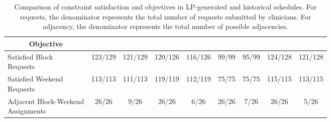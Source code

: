 \begin{table}[htbp]
\begin{adjustbox}{angle=90, scale=0.9}
\begin{tabular}{l|cc|cc|cc|cc}
			\multicolumn{1}{c|}{\textbf{Objective}}             &            &                       &            &                       &            &                       &            &                      \\ \midrule
			\makecell[l]{Satisfied Block \\ Requests}           &  123/129   &        121/129        &  120/126   &        116/126        &   99/99    &         95/99         &  124/128   &       121/128        \\
			\makecell[l]{Satisfied Weekend \\ Requests}         &  113/113   &        111/113        &  119/119   &        112/119        &   75/75    &         75/75         &  115/115   &       113/115        \\
			\makecell[l]{Adjacent Block-Weekend \\ Assignments} &   26/26    &         9/26          &   26/26    &         6/26          &   26/26    &         7/26          &   26/26    &         5/26
		\end{tabular}%
	\end{adjustbox}
	\caption{Comparison of constraint satisfaction and objectives in LP-generated and historical schedules. For requests, the denominator represents the total number of requests submitted by clinicians. For adjacency, the denominator represents the total number of possible adjacencies.}
	\label{tbl:constraints-comparison}%
\end{table}%
